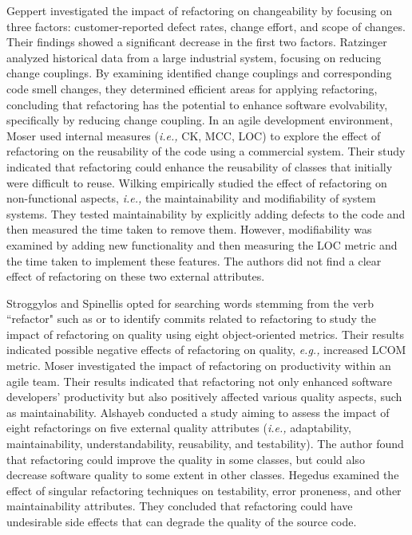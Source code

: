 Geppert \etal \citep{geppert2005refactoring} investigated the impact of refactoring on changeability by focusing on three factors: customer-reported defect rates, change effort, and scope of changes. Their findings showed a significant decrease in the first two factors. Ratzinger \etal \citep{ratzinger2005improving} analyzed historical data from a large industrial system, focusing on reducing change couplings. By examining identified change couplings and corresponding code smell changes, they determined efficient areas for applying refactoring, concluding that refactoring has the potential to enhance software evolvability, specifically by reducing change coupling. In an agile development environment, Moser \etal \citep{moser2006does} used internal measures (\textit{i.e.,} CK, MCC, LOC) to explore the effect of refactoring on the reusability of the code using a commercial system. Their study indicated that refactoring could enhance the reusability of classes that initially were difficult to reuse. Wilking \etal \citep{wilking2007empirical} empirically studied the effect of refactoring on non-functional aspects, \textit{i.e.,} the maintainability and modifiability of system systems. They tested maintainability by explicitly adding defects to the code and then measured the time taken to remove them. However, modifiability was examined by adding new functionality and then measuring the LOC metric and the time taken to implement these features. The authors did not find a clear effect of refactoring on these two external attributes. 

Stroggylos and Spinellis \citep{stroggylos2007refactoring} opted for
searching words stemming from the verb ``refactor" such
as  or  to identify commits related to refactoring to study the impact of refactoring on quality using eight object-oriented metrics. Their results indicated possible negative effects of refactoring on quality, \textit{e.g.,} increased LCOM metric. Moser \etal \citep{moser2007case} investigated the impact of refactoring on productivity within an agile team. Their results indicated that refactoring not only enhanced software developers' productivity but also positively affected various quality aspects, such as maintainability. Alshayeb \citep{alshayeb2009empirical} conducted a study aiming to assess the impact of eight refactorings on five external quality attributes (\textit{i.e.,} adaptability, maintainability, understandability, reusability, and testability). The author found that refactoring could improve the quality in some classes, but could also decrease software quality to some extent in other classes. Hegedus \etal \citep{hegedHus2010effect} examined the effect of singular refactoring techniques on testability, error proneness, and other maintainability attributes. They concluded that refactoring could have undesirable side effects that can degrade the quality of the source code. 


